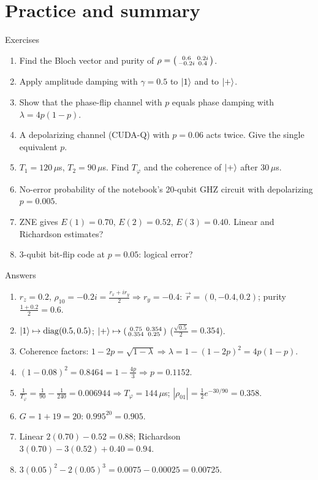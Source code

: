 \documentclass[aspectratio=169,11pt]{beamer}
\begin{document}
\section{Practice and summary}
\begin{frame}{Exercises}
  \begin{enumerate}\small
    \item Find the Bloch vector and purity of $\rho = \begin{psmallmatrix}0.6 & 0.2i\\ -0.2i & 0.4\end{psmallmatrix}$.
    \item Apply amplitude damping with $\gamma = 0.5$ to $\ket1$ and to $\ket+$.
    \item Show that the phase-flip channel with $p$ equals phase damping with $\lambda = 4p(1-p)$.
    \item A depolarizing channel (CUDA-Q) with $p = 0.06$ acts twice. Give the single equivalent $p$.
    \item $T_1 = 120\,\mu$s, $T_2 = 90\,\mu$s. Find $T_\varphi$ and the coherence of $\ket+$ after $30\,\mu$s.
    \item No-error probability of the notebook's 20-qubit GHZ circuit with depolarizing $p = 0.005$.
    \item ZNE gives $E(1) = 0.70$, $E(2) = 0.52$, $E(3) = 0.40$. Linear and Richardson estimates?
    \item 3-qubit bit-flip code at $p = 0.05$: logical error?
  \end{enumerate}
\end{frame}

\begin{frame}{Answers}
  \small
  \begin{enumerate}
    \item $r_z = 0.2$, $\rho_{10} = -0.2i = \frac{r_x + ir_y}{2} \Rightarrow r_y = -0.4$: $\vec r = (0, -0.4, 0.2)$; purity $\frac{1 + 0.2}{2} = 0.6$.
    \item $\ket1 \mapsto \operatorname{diag}(0.5, 0.5)$; $\ket+ \mapsto \begin{psmallmatrix}0.75 & 0.354\\ 0.354 & 0.25\end{psmallmatrix}$ ($\frac{\sqrt{0.5}}{2} = 0.354$).
    \item Coherence factors: $1 - 2p = \sqrt{1-\lambda} \Rightarrow \lambda = 1 - (1-2p)^2 = 4p(1-p)$.
    \item $(1 - 0.08)^2 = 0.8464 = 1 - \frac{4p}{3} \Rightarrow p = 0.1152$.
    \item $\frac1{T_\varphi} = \frac1{90} - \frac1{240} = 0.006944 \Rightarrow T_\varphi = 144\,\mu$s; $|\rho_{01}| = \frac12e^{-30/90} = 0.358$.
    \item $G = 1 + 19 = 20$: $0.995^{20} = 0.905$.
    \item Linear $2(0.70) - 0.52 = 0.88$; Richardson $3(0.70) - 3(0.52) + 0.40 = 0.94$.
    \item $3(0.05)^2 - 2(0.05)^3 = 0.0075 - 0.00025 = 0.00725$.
  \end{enumerate}
\end{frame}
\end{document}

